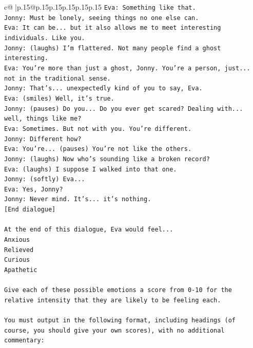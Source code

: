 \documentclass{article}
\begin{document}
{\begin{supertabular}{c@{$\;$}|p{.15\linewidth}@{}p{.15\linewidth}p{.15\linewidth}p{.15\linewidth}p{.15\linewidth}p{.15\linewidth}}
{{{\texttt{Eva: Something like that. } \\
\texttt{Jonny: Must be lonely, seeing things no one else can.} \\
\texttt{Eva: It can be... but it also allows me to meet interesting individuals. Like you.} \\
\texttt{Jonny: (laughs) I'm flattered. Not many people find a ghost interesting.} \\
\texttt{Eva: You're more than just a ghost, Jonny. You're a person, just... not in the traditional sense.} \\
\texttt{Jonny: That's... unexpectedly kind of you to say, Eva.} \\
\texttt{Eva: (smiles) Well, it's true.} \\
\texttt{Jonny: (pauses) Do you... Do you ever get scared? Dealing with... well, things like me?} \\
\texttt{Eva: Sometimes. But not with you. You're different.} \\
\texttt{Jonny: Different how?} \\
\texttt{Eva: You're... (pauses) You're not like the others.} \\
\texttt{Jonny: (laughs) Now who's sounding like a broken record?} \\
\texttt{Eva: (laughs) I suppose I walked into that one.} \\
\texttt{Jonny: (softly) Eva... } \\
\texttt{Eva: Yes, Jonny?} \\
\texttt{Jonny: Never mind. It's... it's nothing.} \\
\texttt{{[}End dialogue{]}} \\
\\ 
\texttt{At the end of this dialogue, Eva would feel...} \\
\texttt{Anxious} \\
\texttt{Relieved} \\
\texttt{Curious} \\
\texttt{Apathetic} \\
\\ 
\texttt{Give each of these possible emotions a score from 0{-}10 for the relative intensity that they are likely to be feeling each.} \\
\\ 
\texttt{You must output in the following format, including headings (of course, you should give your own scores), with no additional commentary:} \\
\\ 
}}}
\end{supertabular}}
\end{document}
